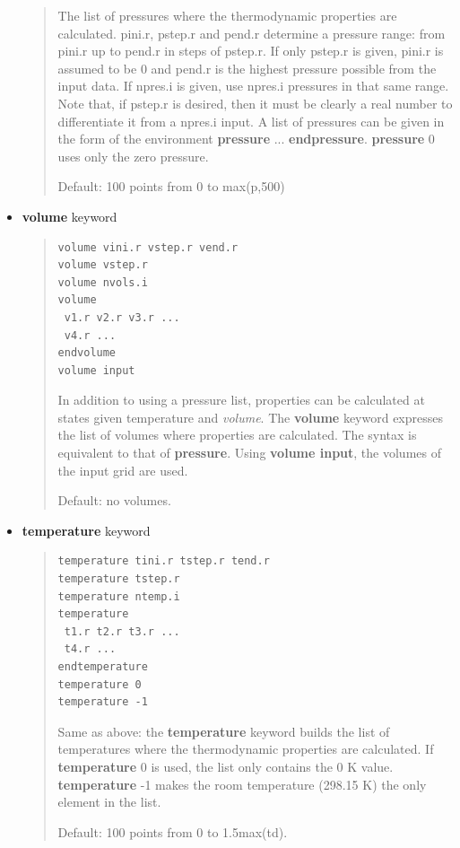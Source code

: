 \documentclass[a4paper]{article}
\begin{document}
\begin{itemize}
\begin{quote}
The list of pressures where the thermodynamic properties are
calculated. pini.r, pstep.r and pend.r determine a pressure
range: from pini.r up to pend.r in steps of pstep.r. If only
pstep.r is given, pini.r is assumed to be 0 and pend.r is the
highest pressure possible from the input data. If npres.i is given,
use npres.i pressures in that same range. Note that, if pstep.r
is desired, then it must be clearly a real number to differentiate
it from a npres.i input. A list of pressures
can be given in the form of the environment \textbf{pressure}
... \textbf{endpressure}. \textbf{pressure} 0 uses only the zero pressure.

Default: 100 points from 0 to max(p,500)

\end{quote}

\item \textbf{volume} keyword
%
\begin{quote}
%
\gibbslist
\begin{lstlisting}
volume vini.r vstep.r vend.r
volume vstep.r
volume nvols.i
volume
 v1.r v2.r v3.r ...
 v4.r ...
endvolume
volume input
\end{lstlisting}

In addition to using a pressure list, properties can be calculated
at states given temperature and \emph{volume}. The \textbf{volume} keyword
expresses the list of volumes where properties are calculated. The
syntax is equivalent to that of \textbf{pressure}. Using \textbf{volume
input}, the volumes of the input grid are used.

Default: no volumes.

\end{quote}

\item \textbf{temperature} keyword
%
\begin{quote}
%
\gibbslist
\begin{lstlisting}
temperature tini.r tstep.r tend.r
temperature tstep.r
temperature ntemp.i
temperature
 t1.r t2.r t3.r ...
 t4.r ...
endtemperature
temperature 0
temperature -1
\end{lstlisting}

Same as above: the \textbf{temperature} keyword builds the list of
temperatures where the thermodynamic properties are calculated. If
\textbf{temperature} 0 is used, the list only contains the 0 K
value. \textbf{temperature} -1 makes the room temperature (298.15 K) the
only element in the list.

Default: 100 points from 0 to 1.5max(td).


\end{quote}
\end{itemize}
\end{document}

